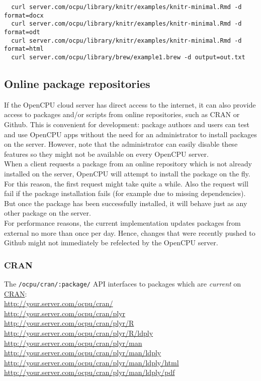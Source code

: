 \documentclass{scrartcl}\usepackage[]{graphicx}\usepackage[]{color}
\begin{document}
\begin{verbatim}
  curl server.com/ocpu/library/knitr/examples/knitr-minimal.Rmd -d format=docx
  curl server.com/ocpu/library/knitr/examples/knitr-minimal.Rmd -d format=odt
  curl server.com/ocpu/library/knitr/examples/knitr-minimal.Rmd -d format=html
  curl server.com/ocpu/library/brew/example1.brew -d output=out.txt
\end{verbatim}


\subsection{Online package repositories}

\noindent If the OpenCPU cloud server has direct access to the internet, it can also provide access to packages and/or scripts from online repositories, such as CRAN or Github. This is convenient for development: package authors and users can test and use OpenCPU apps without the need for an administrator to install packages on the server. However, note that the administrator can easily disable these features so they might not be available on every OpenCPU server.\\

When a client requests a package from an online repository which is not already installed on the server, OpenCPU will attempt to install the package on the fly. For this reason, the first request might take quite a while. Also the request will fail if the package installation fails (for example due to missing dependencies). But once the package has been successfully installed, it will behave just as any other package on the server. \\

For performance reasons, the current implementation updates packages from external no more than once per day. Hence, changes that were recently pushed to Github might not immediately be refelected by the OpenCPU server.

\subsubsection*{CRAN}

The \texttt{/ocpu/cran/:package/} API interfaces to packages which are \emph{current} on \href{http://cran.r-project.org/}{CRAN}: \\

\indent \url{http://your.server.com/ocpu/cran/} \\
\indent \url{http://your.server.com/ocpu/cran/plyr} \\
\indent \url{http://your.server.com/ocpu/cran/plyr/R} \\
\indent \url{http://your.server.com/ocpu/cran/plyr/R/ldply} \\
\indent \url{http://your.server.com/ocpu/cran/plyr/man} \\
\indent \url{http://your.server.com/ocpu/cran/plyr/man/ldply} \\
\indent \url{http://your.server.com/ocpu/cran/plyr/man/ldply/html} \\
\indent \url{http://your.server.com/ocpu/cran/plyr/man/ldply/pdf} 
\end{document}
